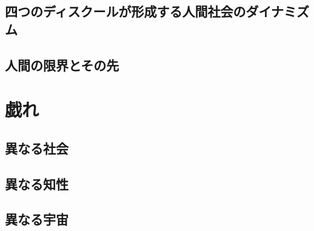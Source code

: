\chapter{四つのディスクールが形成する人間社会のダイナミズム}


\newpage



\newpage



\newpage

\newpage


\chapter{人間の限界とその先}


\newpage


\newpage


\newpage

\part{戯れ}

\chapter{異なる社会}

\chapter{異なる知性}

\chapter{異なる宇宙}

\backmatter

\printbibliography
\newpage


\newpage




